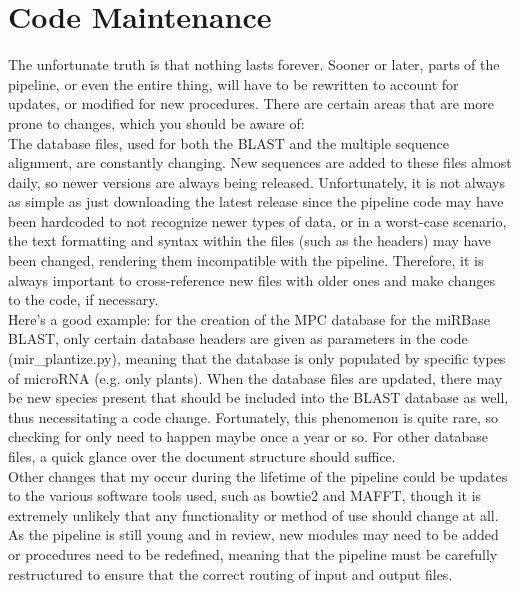 \documentclass[12pt,titlepage]{article}
\begin{document}
\section*{Code Maintenance}

The unfortunate truth is that nothing lasts forever. Sooner or later, parts of the pipeline, or even the entire thing, will have to be rewritten to account for updates, or modified for new procedures. There are certain areas that are more prone to changes, which you should be aware of: \\

The database files, used for both the BLAST and the multiple sequence alignment, are constantly changing. New sequences are added to these files almost daily, so newer versions are always being released. Unfortunately, it is not always as simple as just downloading the latest release since the pipeline code may have been hardcoded to not recognize newer types of data, or in a worst-case scenario, the text formatting and syntax within the files (such as the headers) may have been changed, rendering them incompatible with the pipeline. Therefore, it is always important to cross-reference new files with older ones and make changes to the code, if necessary. \\ 

Here's a good example: for the creation of the MPC database for the miRBase BLAST, only certain database headers are given as parameters in the code (mir\_plantize.py), meaning that the database is only populated by specific types of microRNA (e.g. only plants). When the database files are updated, there may be new species present that should be included into the BLAST database as well, thus necessitating a code change. Fortunately, this phenomenon is quite rare, so checking for only need to happen maybe once a year or so. For other database files, a quick glance over the document structure should suffice. \\

Other changes that my occur during the lifetime of the pipeline could be updates to the various software tools used, such as bowtie2 and MAFFT, though it is extremely unlikely that any functionality or method of use should change at all. As the pipeline is still young and in review, new modules may need to be added or procedures need to be redefined, meaning that the pipeline must be carefully restructured to ensure that the correct routing of input and output files. 
\end{document}
